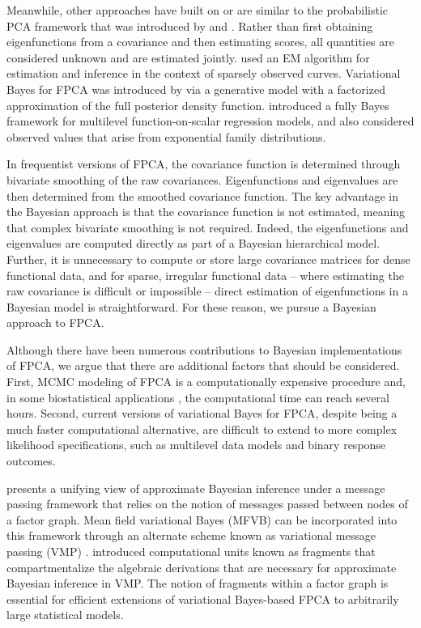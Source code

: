 \documentclass[12pt]{article}
\theoremstyle{plain}
\theoremstyle{definition}
\theoremstyle{remark}
\begin{document}
Meanwhile, other approaches have built on or are similar to the probabilistic PCA framework that was introduced by  and . Rather than first obtaining eigenfunctions from a covariance and then estimating scores, all quantities are considered unknown and are estimated jointly.   used an EM algorithm for estimation and inference in the context of sparsely observed curves. Variational Bayes for FPCA was introduced by  via a generative model with a factorized approximation of the full posterior density function.  introduced a fully Bayes framework for multilevel function-on-scalar
regression models, and also considered observed values that arise from exponential family distributions. 

In frequentist versions of FPCA, the covariance function is determined through bivariate smoothing of the raw
covariances. Eigenfunctions and eigenvalues are then determined from the smoothed covariance function.
The key advantage in the Bayesian approach is that the covariance function is not estimated, meaning that
complex bivariate smoothing is not required. Indeed, the eigenfunctions and eigenvalues are computed directly
as part of a Bayesian hierarchical model. Further, it is unnecessary to compute or store large covariance matrices for dense functional data, and for sparse, irregular functional data -- where estimating the raw covariance is difficult or impossible -- direct estimation of eigenfunctions in a Bayesian model is straightforward. For these reason, we pursue a Bayesian approach to FPCA.

Although there have been numerous contributions to Bayesian implementations of FPCA, we argue that there are
additional factors that should be considered. First, MCMC modeling of FPCA is a computationally expensive
procedure and, in some biostatistical applications \cite{Goldsmith15}, the computational time can reach several
hours. Second, current versions of variational Bayes for FPCA, despite being a much faster computational alternative,
are difficult to extend to more complex likelihood specifications, such as multilevel data models and binary response
outcomes.

 presents a unifying view of approximate Bayesian inference under a message passing framework
that relies on the notion of messages passed between nodes of a factor graph. Mean field variational Bayes (MFVB)
can be incorporated into this framework through an alternate scheme known as variational message passing (VMP)
\cite{winn05}.  introduced computational units known as fragments that compartmentalize
the algebraic derivations that are necessary for approximate Bayesian inference in VMP. The notion of fragments
within a factor graph is essential for efficient extensions of variational Bayes-based FPCA to arbitrarily large statistical
models.
\end{document}
